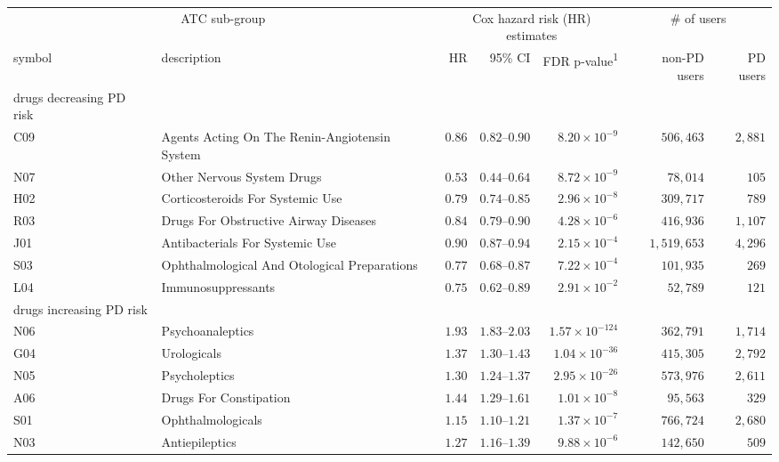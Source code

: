 \captionsetup[table]{labelformat=empty,skip=1pt}
\setlength{\LTpost}{0mm}
\begin{longtable}{llrrrrr}
\toprule
\multicolumn{2}{c}{ATC sub-group} & \multicolumn{3}{c}{Cox hazard risk (HR) estimates} & \multicolumn{2}{c}{\# of users} \\ 
\cmidrule(lr){1-2} \cmidrule(lr){3-5} \cmidrule(lr){6-7}
symbol & description & HR & 95\% CI & FDR p-value\textsuperscript{1} & non-PD users & PD users \\ 
\midrule
\multicolumn{1}{l}{drugs decreasing PD risk} \\ 
\midrule
C09 & Agents Acting On The Renin-Angiotensin System & $0.86$ & $0.82$–$0.90$ & $8.20 \times 10^{-9}$ & $506,463$ & $2,881$ \\ 
N07 & Other Nervous System Drugs & $0.53$ & $0.44$–$0.64$ & $8.72 \times 10^{-9}$ & $78,014$ & $105$ \\ 
H02 & Corticosteroids For Systemic Use & $0.79$ & $0.74$–$0.85$ & $2.96 \times 10^{-8}$ & $309,717$ & $789$ \\ 
R03 & Drugs For Obstructive Airway Diseases & $0.84$ & $0.79$–$0.90$ & $4.28 \times 10^{-6}$ & $416,936$ & $1,107$ \\ 
J01 & Antibacterials For Systemic Use & $0.90$ & $0.87$–$0.94$ & $2.15 \times 10^{-4}$ & $1,519,653$ & $4,296$ \\ 
S03 & Ophthalmological And Otological Preparations & $0.77$ & $0.68$–$0.87$ & $7.22 \times 10^{-4}$ & $101,935$ & $269$ \\ 
L04 & Immunosuppressants & $0.75$ & $0.62$–$0.89$ & $2.91 \times 10^{-2}$ & $52,789$ & $121$ \\ 
\midrule
\multicolumn{1}{l}{drugs increasing PD risk} \\ 
\midrule
N06 & Psychoanaleptics & $1.93$ & $1.83$–$2.03$ & $1.57 \times 10^{-124}$ & $362,791$ & $1,714$ \\ 
G04 & Urologicals & $1.37$ & $1.30$–$1.43$ & $1.04 \times 10^{-36}$ & $415,305$ & $2,792$ \\ 
N05 & Psycholeptics & $1.30$ & $1.24$–$1.37$ & $2.95 \times 10^{-26}$ & $573,976$ & $2,611$ \\ 
A06 & Drugs For Constipation & $1.44$ & $1.29$–$1.61$ & $1.01 \times 10^{-8}$ & $95,563$ & $329$ \\ 
S01 & Ophthalmologicals & $1.15$ & $1.10$–$1.21$ & $1.37 \times 10^{-7}$ & $766,724$ & $2,680$ \\ 
N03 & Antiepileptics & $1.27$ & $1.16$–$1.39$ & $9.88 \times 10^{-6}$ & $142,650$ & $509$ \\ 

\end{longtable}
